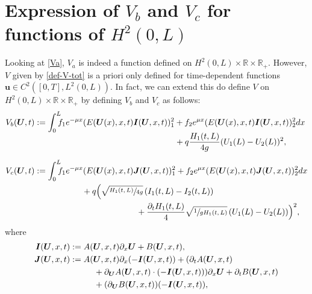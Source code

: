 \section{Expression of \texorpdfstring{$V_{b}$ and $V_{c}$ for functions of $H^{2}(0,L)$}{V}}
\label{sec:VbVc}
Looking at \eqref{Va}, $V_{a}$ is indeed a function defined on $H^{2}(0,L)\times\mathbb{R}\times\mathbb{R}_{+}$. However, $V$ given by \eqref{def-V-tot} is a priori only defined for time-dependent functions $\boldsymbol{u}\in C^{2}([0,T],L^{2}(0,L))$. In fact, we can extend this do define $V$ on $H^{2}(0,L)\times\mathbb{R}\times \mathbb{R}_{+}$ by defining $V_{b}$ and $V_{c}$ as follows:
\begin{align}
V_{b}(\boldsymbol{U},t)&:=\int_{0}^{L}\hspace*{-2mm}f_{1}e^{-\mu x}(E(\boldsymbol{U}(x),x,t)\boldsymbol{I}(\boldsymbol{U},x,t))^{2}_{1}+f_{2}e^{\mu x}(E(\boldsymbol{U}(x),x,t)\boldsymbol{I}(\boldsymbol{U},x,t))^{2}_{2}dx\notag\\[-4pt]
&\hspace*{5.92cm}+q\frac{H_{1}(t,L)}{4g}(U_{1}(L)-U_{2}(L))^{2},\notag\\[-5pt]\label{V2V3}\\[-5pt]
V_{c}(\boldsymbol{U},t)&:=\int_{0}^{L}\hspace*{-2mm}f_{1}e^{-\mu x}(E(\boldsymbol{U}(x),x,t)\boldsymbol{J}(\boldsymbol{U},x,t))^{2}_{1}+f_{2}e^{\mu x}(E(\boldsymbol{U}(x),x,t)\boldsymbol{J}(\boldsymbol{U},x,t))^{2}_{2}dx\notag\\
&\hspace*{2cm}+q\Bigl(\sqrt{\sfrac{H_{1}(t,L)}{4g}}\,(I_{1}(t,L)-I_{2}(t,L))\notag\\
&\hspace*{4.3cm}+\frac{\partial_{t}H_{1}(t,L)}{4}\sqrt{\sfrac{1}{gH_{1}(t,L)}}\,(U_{1}(L)-U_{2}(L)) \Bigr)^{2},\notag
\end{align}
where
\begin{equation}
\begin{split}
\boldsymbol{I}(\boldsymbol{U},x,t)&:=A(\boldsymbol{U},x,t)\partial_{x}\boldsymbol{U}+B(\boldsymbol{U},x,t),\\
\boldsymbol{J}(\boldsymbol{U},x,t)&:=A(\boldsymbol{U},x,t)\partial_{x}(-\boldsymbol{I}(\boldsymbol{U},x,t))+(\partial_{t}A(\boldsymbol{U},x,t)\\
&\hspace*{1cm}+\partial_{\boldsymbol{U}}A(\boldsymbol{U},x,t)\cdot(-\boldsymbol{I}(\boldsymbol{U},x,t)))\partial_{x}\boldsymbol{U}+\partial_{t}B(\boldsymbol{U},x,t)\\
&\hspace*{1cm}+(\partial_{\boldsymbol{U}}B(\boldsymbol{U},x,t))({-\boldsymbol{I}(\boldsymbol{U},x,t)}),
\end{split}
\label{IJ}
\end{equation}
